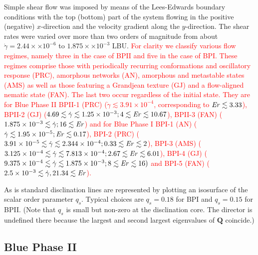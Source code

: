 \documentclass[8.5pt,twoside,twocolumn]{article}
\newcommand{\e}[1]{\times10^{#1}}
\newcommand{\gd}{\dot{\gamma}}
\newcommand{\rev}[1]{{\textcolor{red}{#1}}}
\begin{document}
Simple shear flow was imposed by means of the Lees-Edwards boundary
conditions with
the top (bottom) part of the system flowing in the positive (negative) $x$-direction and the 
velocity gradient along the $y$-direction.
The shear rates were varied over more than two orders of magnitude from about 
$\gd=2.44\times \e{-6}$ to $1.875\times\e{-3}$ LBU.
\rev{For clarity we classify various flow regimes, namely three in the case of BPII and five in the 
case of BPI. These regimes comprise those with periodically recurring conformations and oscillatory response (PRC), 
amorphous networks (AN), amorphous and metastable states (AMS) as well as those featuring a Grandjean texture (GJ) and 
a flow-aligned nematic state (FAN). The last two occur regardless of the initial state. 
They are for Blue Phase II BPII-1 (PRC) ($\gd \lesssim 3.91\e{-4}$, corresponding to ${\it Er} \lesssim 3.33$), 
BPII-2 (GJ) ($4.69\lesssim \gd\lesssim 1.25\e{-3}; 4\lesssim {\it Er} \lesssim 10.67$), 
BPII-3 (FAN) ($1.875\e{-3}\lesssim \gd; 16 \lesssim {\it Er}$) and
for Blue Phase I BPI-1 (AN) ($\gd \lesssim 1.95\e{-5}; {\it Er} \lesssim 0.17$),  
BPI-2 (PRC) ($3.91\e{-5}\lesssim \gd \lesssim 2.344\e{-4}; 0.33\lesssim {\it Er} \lesssim 2$),
BPI-3 (AMS) ($3.125\e{-4}\lesssim \gd\lesssim 7.813\e{-4}; 2.67 \lesssim {\it Er} \lesssim 6.01$),
BPI-4 (GJ) ($9.375\e{-4} \lesssim \gd \lesssim 1.875\e{-3}; 8\lesssim {\it Er} \lesssim 16)$ and
BPI-5 (FAN) ($2.5\e{-3}\lesssim \gd, 21.34\lesssim {\it Er}$).}

As is standard \cite{Henrich:2010b,Henrich:2012b} disclination lines are represented by plotting an isosurface of the scalar order parameter $q_s$. 
Typical choices are $q_s=0.18$ for BPI and $q_s=0.15$ for BPII.
(Note that $q_s$ is small but non-zero at the disclination core. The director is undefined there because the largest and second largest eigenvalues of ${\mathbf Q}$ coincide.)

\subsection{Blue Phase II}
\end{document}
